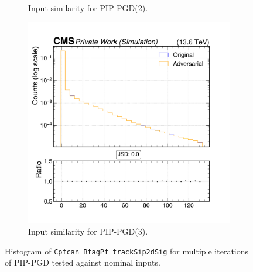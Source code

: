 \begin{figure}[h]
\begin{subfigure}[t]{0.32\textwidth}
    \caption*{Input similarity for PIP-PGD(2).}
  \end{subfigure}\hfill
  \begin{subfigure}[t]{0.32\textwidth}
    \includegraphics[width=\linewidth]{media/output/features/compare/combined_it_3/cmp_cpf_arr_Cpfcan_BtagPf_trackSip2dSig.pdf}
    \caption*{Input similarity for PIP-PGD(3).}
  \end{subfigure}

  \caption*{Histogram of \texttt{Cpfcan\_BtagPf\_trackSip2dSig} for multiple iterations of PIP-PGD tested against nominal inputs.}
  \label{fig:combined_input_Cpfcan_BtagPf_trackSip2dSig}
\end{figure}

